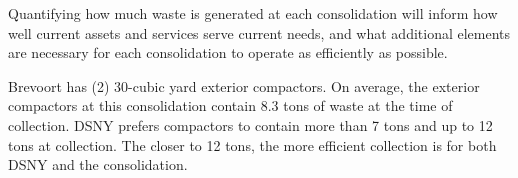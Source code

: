 
    Quantifying how much waste is generated at each consolidation will inform how well current assets and services serve current needs, and what additional elements are necessary for each consolidation to operate as efficiently as possible.
    
    Brevoort has (2) 30-cubic yard exterior compactors. On average, the exterior compactors at this consolidation contain 8.3 tons of waste at the time of collection. DSNY prefers compactors to contain more than 7 tons and up to 12 tons at collection. The closer to 12 tons, the more efficient collection is for both DSNY and the consolidation.